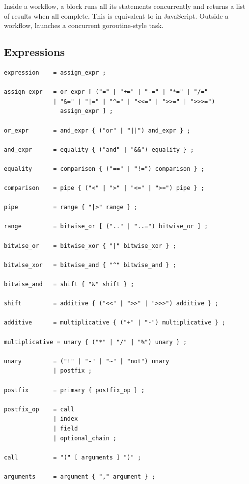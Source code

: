 \begin{note}
Inside a workflow, a  block runs all its statements concurrently and returns a list of results when all complete. This is equivalent to  in JavaScript. Outside a workflow,  launches a concurrent goroutine-style task.
\end{note}

\subsection{Expressions}

\begin{lstlisting}[language=EBNF]
expression    = assign_expr ;

assign_expr   = or_expr [ ("=" | "+=" | "-=" | "*=" | "/="
              | "&=" | "|=" | "^=" | "<<=" | ">>=" | ">>>=")
                assign_expr ] ;

or_expr       = and_expr { ("or" | "||") and_expr } ;

and_expr      = equality { ("and" | "&&") equality } ;

equality      = comparison { ("==" | "!=") comparison } ;

comparison    = pipe { ("<" | ">" | "<=" | ">=") pipe } ;

pipe          = range { "|>" range } ;

range         = bitwise_or [ (".." | "..=") bitwise_or ] ;

bitwise_or    = bitwise_xor { "|" bitwise_xor } ;

bitwise_xor   = bitwise_and { "^" bitwise_and } ;

bitwise_and   = shift { "&" shift } ;

shift         = additive { ("<<" | ">>" | ">>>") additive } ;

additive      = multiplicative { ("+" | "-") multiplicative } ;

multiplicative = unary { ("*" | "/" | "%") unary } ;

unary         = ("!" | "-" | "~" | "not") unary
              | postfix ;

postfix       = primary { postfix_op } ;

postfix_op    = call
              | index
              | field
              | optional_chain ;

call          = "(" [ arguments ] ")" ;

arguments     = argument { "," argument } ;


\end{lstlisting}
